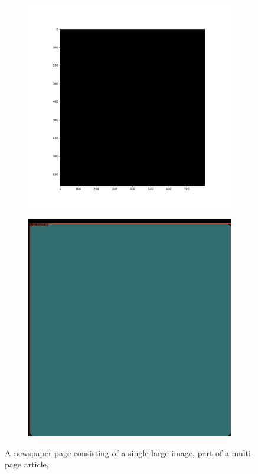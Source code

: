 \documentclass[aspectratio=1610]{beamer}
\begin{document}
\begin{frame}
  \begin{figure}
\centering
\begin{subfigure}{.5\textwidth}
  \centering
  \includegraphics[width=0.7\linewidth, clip=true, trim = 50mm 20mm 60mm 0mm]{figures/tf/1RoKim0.png}
\end{subfigure}%
\begin{subfigure}{.5\textwidth}
  \centering
  \includegraphics[width=0.7\linewidth, clip=true, trim = 0mm 0mm 0mm 0mm]{figures/labels-vanilla-0.75/1RoKim0.jpg}
\end{subfigure}
\caption{A newspaper page consisting of a single large image, part of a multi-page article,}
\label{fig:weather}
\end{figure}
\end{frame}
\normalpage
\end{document}
